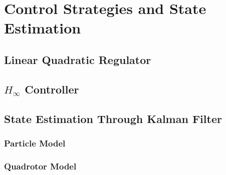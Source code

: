 \chapter{Control Strategies and State Estimation} \label{ch:controlandestimation}


\section{Linear Quadratic Regulator}


\section{$H_\infty$ Controller}


\section{State Estimation Through Kalman Filter}

\subsection{Particle Model}

\subsection{Quadrotor Model}
